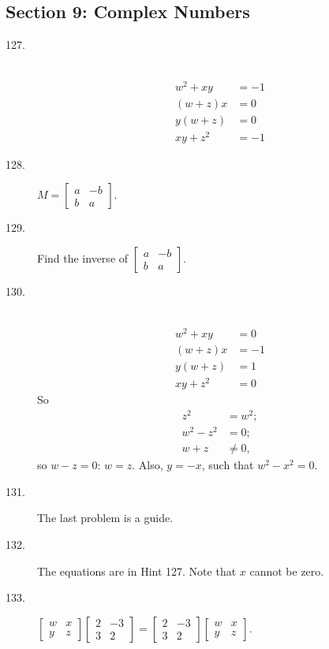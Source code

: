 \documentclass{article}
\begin{document}
\subsection*{Section 9: Complex Numbers}

\begin{description}

  \item[127.] $\ $
    \begin{align*} 
    w^2 + xy & = -1 \\
     (w+z) x & = 0 \\ 
     y (w+z) & = 0 \\
    xy + z^2 & = -1
    \end{align*}

  \item[128.] $M = \begin{bmatrix} a & -b \\ b & a \end{bmatrix}$.

  \item[129.] Find the inverse of $\begin{bmatrix} a & -b \\ b & a \end{bmatrix}$.

  \item[130.] $\ $
    \begin{align*}
    w^2 + xy & = 0 \\
     (w+z) x & = -1 \\ 
     y (w+z) & = 1 \\
    xy + z^2 & = 0
    \end{align*}
    So
    \begin{align*}
    z^2 & = w^2; \\
    w^2 - z^2 & = 0; \\
    w+z & \neq 0,
    \end{align*}
    so $w-z=0$: $w=z$. Also, $y=-x$, such that $w^2 - x^2 = 0$.

  \item[131.] The last problem is a guide.

  \item[132.] The equations are in Hint 127. Note that $x$ cannot be zero.

  \item[133.] $\begin{bmatrix} w & x \\ y & z \end{bmatrix}  \begin{bmatrix} 2 & -3 \\ 3 & 2 \end{bmatrix}  =  \begin{bmatrix} 2 & -3 \\ 3 & 2 \end{bmatrix}  \begin{bmatrix} w & x \\ y & z \end{bmatrix}$.

\end{description}
\end{document}
